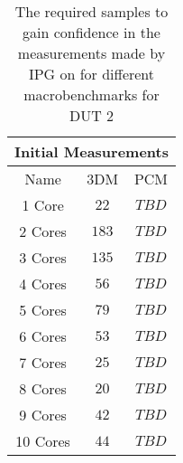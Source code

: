 \begin{table}[H]
    \centering
    \begin{tabular}{|| c | c | c ||}
    \hline
    \multicolumn{3}{||c||}{Initial Measurements} \\ [0.5ex] \hline\hline
    Name & 3DM & PCM \\\hline
    1 Core& $22$ & $TBD$ \\
    2 Cores& $183$ & $TBD$ \\
    3 Cores& $135$ & $TBD$ \\
    4 Cores& $56$ & $TBD$ \\
    5 Cores& $79$ & $TBD$ \\
    6 Cores& $53$ & $TBD$ \\
    7 Cores& $25$ & $TBD$ \\
    8 Cores& $20$ & $TBD$ \\
    9 Cores& $42$ & $TBD$ \\
    10 Cores& $44$ & $TBD$ \\\hline
    \end{tabular}
    \caption{The required samples to gain confidence in the measurements made by IPG on for different macrobenchmarks for DUT 2}
    \label{tab:initial-measurements-exp-3-dut-2-app}
\end{table}
